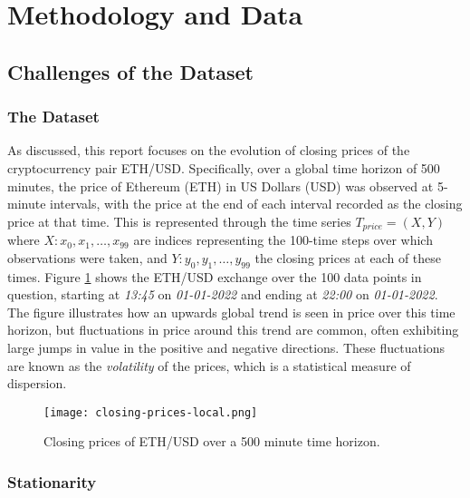 \documentclass[a4paper, 11pt]{article}
\begin{document}
    \section{Methodology and Data}

    \subsection{Challenges of the Dataset}

    \subsubsection{The Dataset}

    As discussed, this report focuses on the evolution of closing prices of the cryptocurrency pair ETH/USD. Specifically, over a global time horizon of 500 minutes, the price of Ethereum (ETH) in US Dollars (USD) was observed at 5-minute intervals, with the price at the end of each interval recorded as the closing price at that time. This is represented through the time series $T_{price} = \left(X, Y \right)$ where $X \colon x_0, x_1, \ldots, x_{99}$ are indices representing the 100-time steps over which observations were taken, and $Y: y_0, y_1, \ldots, y_{99}$ the closing prices at each of these times. Figure \ref{fig:closing-prices} shows the ETH/USD exchange over the 100 data points in question, starting at \emph{13:45} on \emph{01-01-2022} and ending at \emph{22:00} on \emph{01-01-2022}. The figure illustrates how an upwards global trend is seen in price over this time horizon, but fluctuations in price around this trend are common, often exhibiting large jumps in value in the positive and negative directions. These fluctuations are known as the \emph{volatility} of the prices, which is a statistical measure of dispersion.

    \begin{figure}[ht]
        \centering
        \caption{\centering Closing prices of ETH/USD over a 500 minute time horizon.}
        \texttt{[image: closing-prices-local.png]}
        \label{fig:closing-prices}
    \end{figure}

    \subsubsection{Stationarity}
\end{document}
